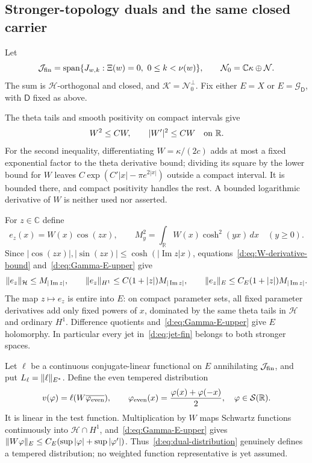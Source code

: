 \documentclass[11pt,a4paper]{article}
\numberwithin{equation}{section}
\theoremstyle{definition}\newtheorem{definition}[theorem]{Definition}
\theoremstyle{remark}\newtheorem{remark}[theorem]{Remark}
\newcommand{\R}{\mathbb R}\newcommand{\C}{\mathbb C}\newcommand{\N}{\mathbb N}
\newcommand{\Hh}{\mathcal H}\newcommand{\Hw}{\mathcal H}
\newcommand{\Nn}{\mathcal N}\newcommand{\Ii}{\mathcal I}\newcommand{\Zz}{\mathcal Z}
\newcommand{\Kk}{\mathcal K}\newcommand{\Aa}{\mathcal A}\newcommand{\Ff}{\mathcal F}
\begin{document}
\subsection{Stronger-topology duals and the same closed carrier}\label{d:sec:Gamma-dual-carrier}

Let
\begin{equation}\label{d:eq:jet-fin}
 \mathcal J_{\rm fin}=\operatorname{span}\{J_{w,k}:\Xi(w)=0,\ 0\le k<\nu(w)\},
 \qquad \Nn_0=\C\kappa\oplus\Nn.
\end{equation}
The sum is $\Hh$-orthogonal and closed, and $\Kk=\Nn_0^\perp$. Fix either $E={X}$ or $E=\mathcal G_{\mathsf D}$, with $\mathsf D$ fixed as above.

The theta tails and smooth positivity on compact intervals give
\begin{equation}\label{d:eq:W-derivative-bound}
 W^2\le C W,\qquad |W'|^2\le C W\quad\hbox{on }\R.
\end{equation}
For the second inequality, differentiating $W=\kappa/(2c)$ adds at most a fixed exponential factor to the theta derivative bound; dividing its square by the lower bound for $W$ leaves
$C\exp(C'|x|-\pi e^{2|x|})$ outside a compact interval. It is bounded there, and compact positivity handles the rest. A bounded logarithmic derivative of $W$ is neither used nor asserted.

For $z\in\C$ define
\[
 e_z(x)=W(x)\cos(zx),\qquad
 M_y^2=\int_\R W(x)\cosh^2(yx)\,dx\quad(y\ge0).
\]
Since $|\cos(zx)|,|\sin(zx)|\le\cosh(|\operatorname{Im}z|x)$, equations~\eqref{d:eq:W-derivative-bound} and~\eqref{d:eq:Gamma-E-upper} give
\begin{equation}\label{d:eq:dual-evaluation}
 \norm{e_z}_{\Hh}\le M_{|\operatorname{Im}z|},\qquad
 \norm{e_z}_{H^1}\le C(1+|z|)M_{|\operatorname{Im}z|},\qquad
 \norm{e_z}_E\le C_E(1+|z|)M_{|\operatorname{Im}z|}.
\end{equation}
The map $z\mapsto e_z$ is entire into $E$: on compact parameter sets, all fixed parameter derivatives add only fixed powers of $x$, dominated by the same theta tails in $\Hh$ and ordinary $H^1$. Difference quotients and~\eqref{d:eq:Gamma-E-upper} give $E$ holomorphy. In particular every jet in~\eqref{d:eq:jet-fin} belongs to both stronger spaces.

Let $\ell$ be a continuous conjugate-linear functional on $E$ annihilating $\mathcal J_{\rm fin}$, and put $L_\ell=\lVert\ell\rVert_{E^*}$. Define the even tempered distribution
\begin{equation}\label{d:eq:dual-distribution}
 v(\varphi)=\ell(W\overline{\varphi_{\rm even}}),\qquad
 \varphi_{\rm even}(x)=\frac{\varphi(x)+\varphi(-x)}2,
 \quad\varphi\in\mathcal S(\R).
\end{equation}
It is linear in the test function. Multiplication by $W$ maps Schwartz functions continuously into $\Hh\cap H^1$, and~\eqref{d:eq:Gamma-E-upper} gives
$\lVert W\varphi\rVert_E\le C_E(\sup|\varphi|+\sup|\varphi'|)$.
Thus~\eqref{d:eq:dual-distribution} genuinely defines a tempered distribution; no weighted function representative is yet assumed.
\end{document}
